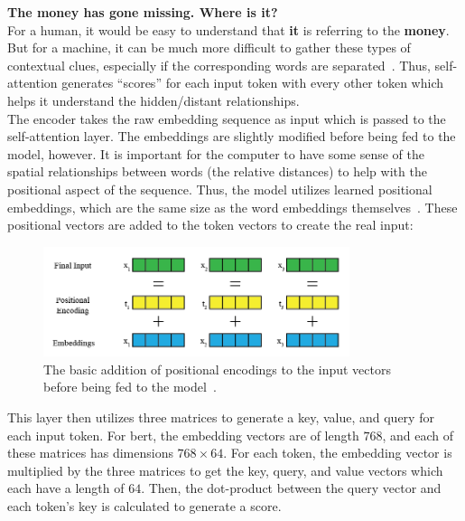 \textbf{The money has gone missing. Where is it?} \\

For a human, it would be easy to understand that \textbf{it} is referring to the \textbf{money}. But for a machine, it can be much more difficult to gather these types of contextual clues, especially if the corresponding words are separated~\parencite{hochreiter1997long}. Thus, self-attention generates “scores” for each input token with every other token which helps it understand the hidden/distant relationships. \\

The encoder takes the raw embedding sequence as input which is passed to the self-attention layer. The embeddings are slightly modified before being fed to the model, however. It is important for the computer to have some sense of the spatial relationships between words (the relative distances) to help with the positional aspect of the sequence. Thus, the model utilizes learned positional embeddings, which are the same size as the word embeddings themselves~\parencite{devlin2019bert:}. These positional vectors are added to the token vectors to create the real input:

\begin{figure}[h]
\centering
\includegraphics[width=0.8\textwidth]{fig/positional_encodings.png}
\caption{The basic addition of positional encodings to the input vectors before being fed to the model~\parencite{alammar_2018}.
}
\label{fig:positional_encodings}
\end{figure}

This layer then utilizes three matrices to generate a key, value, and query for each input token. For \acrshort{bert}, the embedding vectors are of length $768$, and each of these matrices has dimensions $768 \times 64$. For each token, the embedding vector is multiplied by the three matrices to get the key, query, and value vectors which each have a length of $64$. Then, the dot-product between the query vector and each token’s key is calculated to generate a score.

